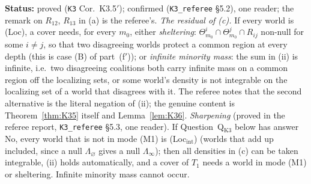 \documentclass[11pt]{article}
\theoremstyle{definition}
\theoremstyle{remark}
\newcommand{\src}[1]{\texttt{#1}}
\newcommand{\status}[1]{\par\smallskip\noindent\textbf{Status:} #1\par\smallskip}
\begin{document}
\status{proved (\src{K3} Cor.~K3.5$'$); confirmed (\src{K3\_referee} \S5.2), one reader; the remark on $R_{12}$, $R_{13}$ in (a) is the referee's. \emph{The residual of (c).} If every world is (Loc), a cover needs, for every $m_0$, either \emph{sheltering}: $\Theta^i_{m_0}\cap\Theta^j_{m_0}\cap R_{ij}$ non-null for some $i\ne j$, so that two disagreeing worlds protect a common region at every depth (this is case (B) of part~(f$'$)); or \emph{infinite minority mass}: the sum in (ii) is infinite, i.e.\ two disagreeing coalitions both carry infinite mass on a common region off the localizing sets, or some world's density is not integrable on the localizing set of a world that disagrees with it. The referee notes that the second alternative is the literal negation of (ii); the genuine content is Theorem~\ref{thm:K35} itself and Lemma~\ref{lem:K36}. \emph{Sharpening} (proved in the referee report, \src{K3\_referee} \S5.3, one reader). If Question~Q$_{\mathrm{K3}}$ below has answer No, every world that is not in mode (M1) is (Loc$_{\mathrm{int}}$) (worlds that add up included, since a null $\Lambda_\varnothing$ gives a null $\Lambda_\infty$); then all densities in (c) can be taken integrable, (ii) holds automatically, and a cover of $T_1$ needs a world in mode (M1) or sheltering. Infinite minority mass cannot occur.}
\end{document}
